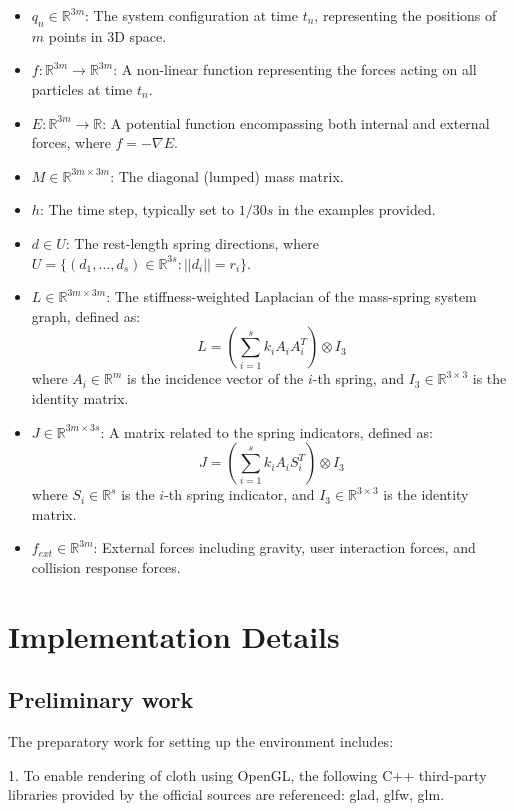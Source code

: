 \documentclass[acmtog]{acmart}
\begin{document}
\begin{itemize}
  \item $q_n \in \mathbb{R}^{3m}$: The system configuration at time $t_n$, representing the positions of $m$ points in 3D space.
  \item $f : \mathbb{R}^{3m} \rightarrow \mathbb{R}^{3m}$: A non-linear function representing the forces acting on all particles at time $t_n$.
  \item $E : \mathbb{R}^{3m} \rightarrow \mathbb{R}$: A potential function encompassing both internal and external forces, where $f = -\nabla E$.
  \item $M \in \mathbb{R}^{3m \times 3m}$: The diagonal (lumped) mass matrix.
  \item $h$: The time step, typically set to $1/30s$ in the examples provided.
  \item $d \in U$: The rest-length spring directions, where $U = \{(d_1, \ldots, d_s) \in \mathbb{R}^{3s} : ||d_i|| = r_i\}$.
  \item $L \in \mathbb{R}^{3m \times 3m}$: The stiffness-weighted Laplacian of the mass-spring system graph, defined as:
  \[
      L = \left( \sum_{i=1}^{s} k_i A_i A_i^T \right) \otimes I_3
  \]
  where $A_i \in \mathbb{R}^{m}$ is the incidence vector of the $i$-th spring, and $I_3 \in \mathbb{R}^{3 \times 3}$ is the identity matrix.

  \item $J \in \mathbb{R}^{3m \times 3s}$: A matrix related to the spring indicators, defined as:
  \[
      J = \left( \sum_{i=1}^{s} k_i A_i S_i^T \right) \otimes I_3
  \]
  where $S_i \in \mathbb{R}^{s}$ is the $i$-th spring indicator, and $I_3 \in \mathbb{R}^{3 \times 3}$ is the identity matrix.
  \item $f_{ext} \in \mathbb{R}^{3m}$: External forces including gravity, user interaction forces, and collision response forces.
\end{itemize}

\section{Implementation Details}

\subsection{Preliminary work}

The preparatory work for setting up the environment includes:

1. To enable rendering of cloth using OpenGL, the following C++ third-party libraries provided by the official sources are referenced: glad, glfw, glm.
\end{document}
